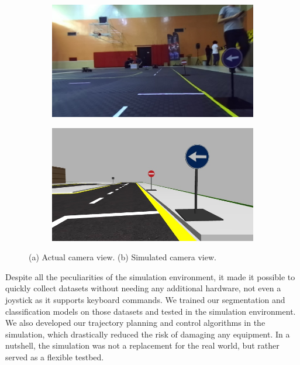 \begin{figure}[h]
  \centering
  \begin{subfigure}[b]{0.4\linewidth}
    \includegraphics[width=\linewidth]{figures/actual-camera-view.jpg}
    \caption{}
  \end{subfigure}
  \begin{subfigure}[b]{0.4\linewidth}
    \includegraphics[width=\linewidth]{figures/simulated-camera-view.jpg}
    \caption{}
  \end{subfigure}
  \caption[Comparison of actual and simulated camera views]{(a) Actual camera
    view. (b) Simulated camera view.}
  \label{figure:camera-view}
\end{figure}

Despite all the peculiarities of the simulation environment, it made it
possible to quickly collect datasets without needing any additional hardware,
not even a joystick as it supports keyboard commands. We trained our
segmentation and classification models on those datasets and tested in the
simulation environment. We also developed our trajectory planning and control
algorithms in the simulation, which drastically reduced the risk of damaging
any equipment. In a nutshell, the simulation was not a replacement for the real
world, but rather served as a flexible testbed.
